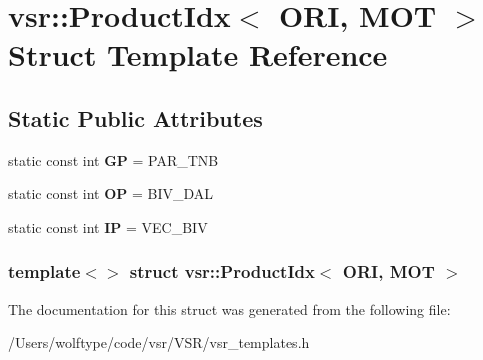 \hypertarget{structvsr_1_1_product_idx_3_01_o_r_i_00_01_m_o_t_01_4}{\section{vsr\-:\-:Product\-Idx$<$ O\-R\-I, M\-O\-T $>$ Struct Template Reference}
\label{structvsr_1_1_product_idx_3_01_o_r_i_00_01_m_o_t_01_4}
}
\subsection*{Static Public Attributes}
\begin{DoxyCompactItemize}
\item 
\hypertarget{structvsr_1_1_product_idx_3_01_o_r_i_00_01_m_o_t_01_4_a4f582d5f57c738749673bfbab07389d8}{static const int {\bfseries G\-P} = P\-A\-R\-\_\-\-T\-N\-B}\label{structvsr_1_1_product_idx_3_01_o_r_i_00_01_m_o_t_01_4_a4f582d5f57c738749673bfbab07389d8}

\item 
\hypertarget{structvsr_1_1_product_idx_3_01_o_r_i_00_01_m_o_t_01_4_aa2f24c8b86497468ec20a18dc31050b3}{static const int {\bfseries O\-P} = B\-I\-V\-\_\-\-D\-A\-L}\label{structvsr_1_1_product_idx_3_01_o_r_i_00_01_m_o_t_01_4_aa2f24c8b86497468ec20a18dc31050b3}

\item 
\hypertarget{structvsr_1_1_product_idx_3_01_o_r_i_00_01_m_o_t_01_4_a4f89b7a97ee4362ed4bbe6a013bd9057}{static const int {\bfseries I\-P} = V\-E\-C\-\_\-\-B\-I\-V}\label{structvsr_1_1_product_idx_3_01_o_r_i_00_01_m_o_t_01_4_a4f89b7a97ee4362ed4bbe6a013bd9057}

\end{DoxyCompactItemize}
\subsubsection*{template$<$$>$ struct vsr\-::\-Product\-Idx$<$ O\-R\-I, M\-O\-T $>$}



The documentation for this struct was generated from the following file\-:\begin{DoxyCompactItemize}
\item 
/\-Users/wolftype/code/vsr/\-V\-S\-R/vsr\-\_\-templates.\-h\end{DoxyCompactItemize}
